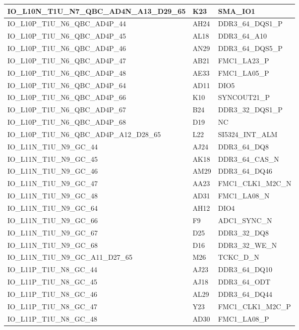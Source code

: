 \begin{footnotesize}
\begin{longtable}{|p{7cm}|p{1cm}|p{5cm}|}
IO\_L10N\_T1U\_N7\_QBC\_AD4N\_A13\_D29\_65	&	K23	&	SMA\_IO1	\\ \hline
IO\_L10P\_T1U\_N6\_QBC\_AD4P\_44	&	AH24	&	DDR3\_64\_DQS1\_P	\\ \hline
IO\_L10P\_T1U\_N6\_QBC\_AD4P\_45	&	AL18	&	DDR3\_64\_A10	\\ \hline
IO\_L10P\_T1U\_N6\_QBC\_AD4P\_46	&	AN29	&	DDR3\_64\_DQS5\_P	\\ \hline
IO\_L10P\_T1U\_N6\_QBC\_AD4P\_47	&	AB21	&	FMC1\_LA23\_P	\\ \hline
IO\_L10P\_T1U\_N6\_QBC\_AD4P\_48	&	AE33	&	FMC1\_LA05\_P	\\ \hline
IO\_L10P\_T1U\_N6\_QBC\_AD4P\_64	&	AD11	&	DIO5	\\ \hline
IO\_L10P\_T1U\_N6\_QBC\_AD4P\_66	&	K10	&	SYNCOUT21\_P	\\ \hline
IO\_L10P\_T1U\_N6\_QBC\_AD4P\_67	&	B24	&	DDR3\_32\_DQS1\_P	\\ \hline
IO\_L10P\_T1U\_N6\_QBC\_AD4P\_68	&	D19	&	NC	\\ \hline
IO\_L10P\_T1U\_N6\_QBC\_AD4P\_A12\_D28\_65	&	L22	&	SI5324\_INT\_ALM	\\ \hline
IO\_L11N\_T1U\_N9\_GC\_44	&	AJ24	&	DDR3\_64\_DQ8	\\ \hline
IO\_L11N\_T1U\_N9\_GC\_45	&	AK18	&	DDR3\_64\_CAS\_N	\\ \hline
IO\_L11N\_T1U\_N9\_GC\_46	&	AM29	&	DDR3\_64\_DQ46	\\ \hline
IO\_L11N\_T1U\_N9\_GC\_47	&	AA23	&	FMC1\_CLK1\_M2C\_N	\\ \hline
IO\_L11N\_T1U\_N9\_GC\_48	&	AD31	&	FMC1\_LA08\_N	\\ \hline
IO\_L11N\_T1U\_N9\_GC\_64	&	AH12	&	DIO4	\\ \hline
IO\_L11N\_T1U\_N9\_GC\_66	&	F9	&	ADC1\_SYNC\_N	\\ \hline
IO\_L11N\_T1U\_N9\_GC\_67	&	D25	&	DDR3\_32\_DQ8	\\ \hline
IO\_L11N\_T1U\_N9\_GC\_68	&	D16	&	DDR3\_32\_WE\_N	\\ \hline
IO\_L11N\_T1U\_N9\_GC\_A11\_D27\_65	&	M26	&	TCKC\_D\_N	\\ \hline
IO\_L11P\_T1U\_N8\_GC\_44	&	AJ23	&	DDR3\_64\_DQ10	\\ \hline
IO\_L11P\_T1U\_N8\_GC\_45	&	AJ18	&	DDR3\_64\_ODT	\\ \hline
IO\_L11P\_T1U\_N8\_GC\_46	&	AL29	&	DDR3\_64\_DQ44	\\ \hline
IO\_L11P\_T1U\_N8\_GC\_47	&	Y23	&	FMC1\_CLK1\_M2C\_P	\\ \hline
IO\_L11P\_T1U\_N8\_GC\_48	&	AD30	&	FMC1\_LA08\_P	\\ \hline

\end{longtable}
\end{footnotesize}
